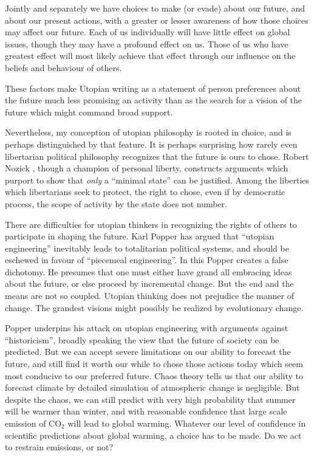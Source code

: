 Jointly and separately we have choices to make (or evade) about our future, and about our present actions, with a greater or lesser awareness of how those choices may affect our future.
Each of us individually will have little effect on global issues, though they may have a profound effect on us.
Those of us who have greatest effect will most likely achieve that effect through our influence on the beliefs and behaviour of others.

These factors make Utopian writing as a statement of person preferences about the future much less promising an activity than as the search for a vision of the future which might command broad support.

Nevertheless, my conception of utopian philosophy is rooted in choice, and is perhaps distinguished by that feature.
It is perhaps surprising how rarely even libertarian political philosophy recognizes that the future is ours to chose.
Robert Nozick \cite{nozickASU}, though a champion of personal liberty, constructs arguments which purport to show that {\it only} a ``minimal state'' can be justified.
Among the liberties which libertarians seek to protect, the right to chose, even if by democratic process, the scope of activity by the state does not number.

There are difficulties for utopian thinkers in recognizing the rights of others to participate in shaping the future.
Karl Popper has argued \cite{popperPOH} that ``utopian engineering'' inevitably leads to totalitarian political systems, and should be eschewed in favour of ``piecemeal engineering''.
In this Popper creates a false dichotomy.
He presumes that one must either have grand all embracing ideas about the future, or else proceed by incremental change.
But the end and the means are not so coupled.
Utopian thinking does not prejudice the manner of change.
The grandest visions might possibly be realized by evolutionary change.

Popper underpins his attack on utopian engineering with arguments against ``historicism'', broadly speaking the view that the future of society can be predicted.
But we can accept severe limitations on our ability to forecast the future, and still find it worth our while to chose those actions today which seem most conducive to our preferred future.
Chaos theory tells us that our ability to forecast climate by detailed simulation of atmospheric change is negligible.
But despite the chaos, we can still predict with very high probability that summer will be warmer than winter, and with reasonable confidence that large scale emission of CO$_2$ will lead to global warming.
Whatever our level of confidence in scientific predictions about global warming, a choice has to be made.
Do we act to restrain emissions, or not?

